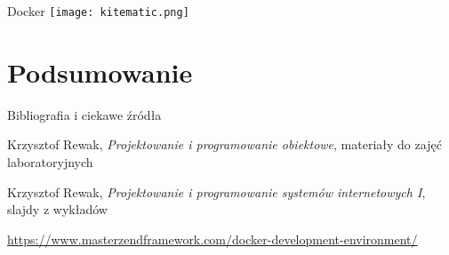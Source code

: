 \begin{frame}{Docker}
	\centering
	\texttt{[image: kitematic.png]}
\end{frame}

\section{Podsumowanie}

\begin{frame}{Bibliografia i ciekawe źródła}
  
	\begin{thebibliography}{9}
	
		Krzysztof Rewak,
		\textit{Projektowanie i programowanie obiektowe},
		materiały do zajęć laboratoryjnych
	
		Krzysztof Rewak,
		\textit{Projektowanie i programowanie systemów internetowych I},
		slajdy z wykładów
		
		\url{https://www.masterzendframework.com/docker-development-environment/}
	
	\end{thebibliography}

\end{frame}

